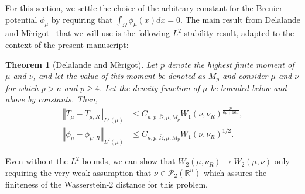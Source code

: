 \documentclass{amsart}
\newtheorem{theorem}{Theorem}
\theoremstyle{lemma}
\theoremstyle{remark}
\begin{document}
For this section, we settle the choice of the arbitrary constant for the Brenier potential $\phi_{\mu}$ by requiring that $\int_{\Omega} \phi_{\mu}(x)dx = 0$. The main result from Delalande and M\`{e}rigot~\cite{merigot1} that we will use is the following $L^2$ stability result, adapted to the context of the present manuscript:
\begin{theorem}[Delalande and M\`{e}rigot]\label{thm:delalandemerigot}
Let $p$ denote the highest finite moment of $\mu$ and $\nu$, and let the value of this moment be denoted as $M_p$ and consider $\mu$ and $\nu$ for which $p>n$ and $p \geq 4$. Let the density function of $\mu$ be bounded below and above by constants. Then,
\begin{align}\label{eq:L2convergence}
\left\Vert T_{\mu} - T_{\mu;R} \right\Vert_{L^2 \left( \mu \right)} &\leq C_{n, p, \overline{\Omega}, \mu, M_{p}}  W_{1}(\nu, \nu_{R})^{\frac{p}{6p+16n}}, \\
\left\Vert \phi_{\mu}- \phi_{\mu;R} \right\Vert_{L^2 \left( \mu \right)} &\leq C_{n, p, \overline{\Omega}, \mu, M_{p}}  W_{1}(\nu, \nu_{R})^{1/2}.
\end{align}
\end{theorem}

Even without the $L^2$ bounds, we can show that $W_2(\mu, \nu_{R}) \rightarrow W_2(\mu, \nu)$ only requiring the very weak assumption that $\nu \in \mathcal{P}_{2}(\mathbb{R}^n)$ which assures the finiteness of the Wasserstein-2 distance for this problem.
\end{document}
